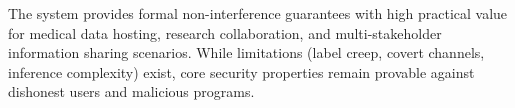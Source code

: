 The system provides formal non-interference guarantees with high practical value for medical data hosting, research collaboration, and multi-stakeholder information sharing scenarios. While limitations (label creep, covert channels, inference complexity) exist, core security properties remain provable against dishonest users and malicious programs.

